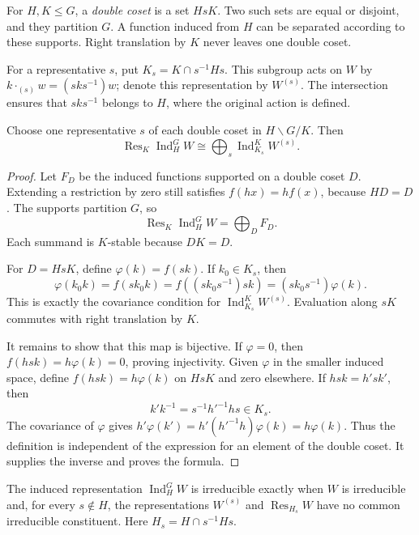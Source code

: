 For $H,K\le G$, a \emph{double coset} is a set $HsK$. Two such sets are equal or disjoint, and they partition $G$. A function induced from $H$ can be separated according to these supports. Right translation by $K$ never leaves one double coset.

For a representative $s$, put $K_s=K\cap s^{-1}Hs$. This subgroup acts on $W$ by
$k\cdot_{(s)}w=(sks^{-1})w$; denote this representation by $W^{(s)}$. The intersection ensures that $sks^{-1}$ belongs to $H$, where the original action is defined.

\begin{theorem}[Mackey, 1951]\label{thm:mackey}
Choose one representative $s$ of each double coset in $H\backslash G/K$. Then
\[
\operatorname{Res}_K\operatorname{Ind}_H^GW
\cong\bigoplus_s\operatorname{Ind}_{K_s}^KW^{(s)}.
\]
\end{theorem}

\begin{proof}
Let $F_D$ be the induced functions supported on a double coset $D$. Extending a restriction by zero still satisfies $f(hx)=hf(x)$, because $HD=D$. The supports partition $G$, so
\[
\operatorname{Res}_K\operatorname{Ind}_H^GW=\bigoplus_DF_D.
\]
Each summand is $K$-stable because $DK=D$.

For $D=HsK$, define $\varphi(k)=f(sk)$. If $k_0\in K_s$, then
\[
\varphi(k_0k)=f(sk_0k)
=f((sk_0s^{-1})sk)
=(sk_0s^{-1})\varphi(k).
\]
This is exactly the covariance condition for $\operatorname{Ind}_{K_s}^KW^{(s)}$. Evaluation along $sK$ commutes with right translation by $K$.

It remains to show that this map is bijective. If $\varphi=0$, then $f(hsk)=h\varphi(k)=0$, proving injectivity. Given $\varphi$ in the smaller induced space, define
$f(hsk)=h\varphi(k)$ on $HsK$ and zero elsewhere. If $hsk=h'sk'$, then
\[
k'k^{-1}=s^{-1}h'^{-1}hs\in K_s.
\]
The covariance of $\varphi$ gives
$h'\varphi(k')=h'(h'^{-1}h)\varphi(k)=h\varphi(k)$.
Thus the definition is independent of the expression for an element of the double coset. It supplies the inverse and proves the formula.
\end{proof}

\begin{corollary}\label{cor:mackeyirr}
The induced representation $\operatorname{Ind}_H^GW$ is irreducible exactly when $W$ is irreducible and, for every $s\notin H$, the representations $W^{(s)}$ and $\operatorname{Res}_{H_s}W$ have no common irreducible constituent. Here $H_s=H\cap s^{-1}Hs$.
\end{corollary}

